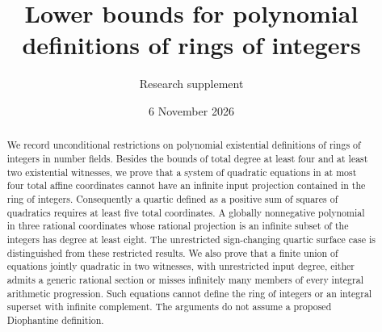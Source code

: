 \documentclass[11pt]{article}
\title{Lower bounds for polynomial definitions of rings of integers}
\author{Research supplement}
\date{6 November 2026}
\theoremstyle{remark}
\begin{document}
\maketitle
\begin{abstract}
We record unconditional restrictions on polynomial existential definitions
of rings of integers in number fields. Besides the bounds of total degree
at least four and at least two existential witnesses, we prove that a
system of quadratic equations in at most four total affine coordinates
cannot have an infinite input projection contained in the ring of integers.
Consequently a quartic defined as a positive sum of squares of quadratics
requires at least five total coordinates. A globally nonnegative polynomial
in three rational coordinates whose rational projection is an infinite
subset of the integers has degree at least eight. The unrestricted
sign-changing quartic surface case is distinguished from these restricted
results. We also prove that a finite union of equations jointly quadratic
in two witnesses, with unrestricted input degree, either admits a generic
rational section or misses infinitely many members of every integral
arithmetic progression. Such equations cannot define the ring of integers
or an integral superset with infinite complement. The arguments do not
assume a proposed Diophantine definition.
\end{abstract}
\tableofcontents





\end{document}
